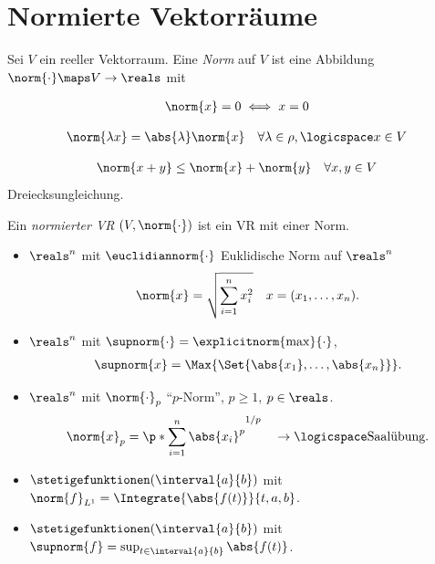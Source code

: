 \chapter{Normierte Vektorräume}
\begin{definition}\label{norm}
    Sei \( V \) ein reeller Vektorraum. Eine \emph{Norm} auf \( V \) ist eine Abbildung \( \norm{\cdot}\maps V\to \reals \) mit
    \begin{eigenschaftenenumerate}
        \item\label{norm:positiv_definit}
        \begin{align*}
            \norm{x}=0\iff x=0
        \end{align*}
        \item \label{norm:betrags_homogen}
        \begin{align*}
            \norm{\lambda x}=\abs{\lambda}\norm{x}\quad \forall \lambda\in \rho,\logicspace x\in V
        \end{align*}
        
        \item \label{norm:dreiecksungleichung}\begin{align*}
            \norm{x+y}\leq \norm{x}+\norm{y}\quad \forall x,y\in V
        \end{align*}
        Dreiecksungleichung.
    \end{eigenschaftenenumerate}
    Ein \emph{normierter VR} \( (V,\norm{\cdot}) \) ist ein VR mit einer Norm.
\end{definition}
\begin{beispiele*}
    \begin{itemize}
        \item \( \reals^n \) mit \( \euclidiannorm{\cdot} \) Euklidische Norm auf \( \reals^n \)
        \begin{align*}
            \norm{x}=\sqrt{\sum_{i=1}^{n}x_i^2}\quad x=(x_{1},\dotsc,x_n).
        \end{align*}
        \item \( \reals^n \) mit \( \supnorm{\cdot}=\explicitnorm{\max}{\cdot} \),
        \begin{align*}
            \supnorm{x}=\Max{\Set{\abs{x_1},\dotsc,\abs{x_n}}}.
        \end{align*}
        \item \( \reals^n \) mit \( \norm{\cdot}_p \) \enquote{\( p \)-Norm}, \( p\geq 1 \), \( p\in \reals \).
        \begin{align*}
            \norm{x}_{p}=\p*{ \sum_{i=1}^{n}\abs{x_i}^p }^{1/p}\quad \to\logicspace  \text{Saalübung}.
        \end{align*}
        \item \( \stetigefunktionen(\interval{a}{b}) \) mit \( \norm{f}_{L^1}=\Integrate{\abs{f(t)}}{t,a,b} \). 
        \item \( \stetigefunktionen(\interval{a}{b}) \) mit \( \supnorm{f}=\sup_{t\in \interval{a}{b}}\abs{f(t)} \). 
    \end{itemize}
\end{beispiele*}
